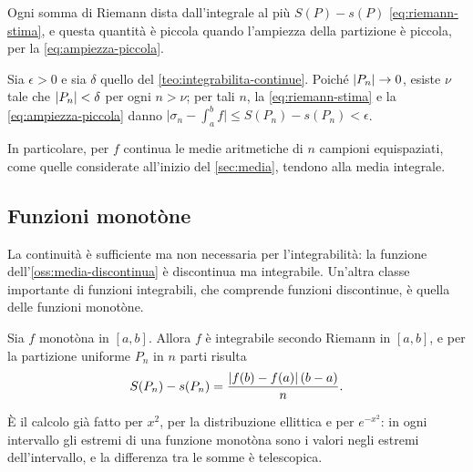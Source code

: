 \begin{strategia}
Ogni somma di Riemann dista dall'integrale al più $S(P)-s(P)$ \eqref{eq:riemann-stima}, e
questa quantità è piccola quando l'ampiezza della partizione è piccola, per la
\eqref{eq:ampiezza-piccola}.
\end{strategia}

\begin{dimostrazione}
Sia $\epsilon>0$ e sia $\delta$ quello del \cref{teo:integrabilita-continue}. Poiché
$\lvert P_{n}\rvert\to0$, esiste $\nu$ tale che $\lvert P_{n}\rvert<\delta$ per ogni $n>\nu$; per tali $n$,
la \eqref{eq:riemann-stima} e la \eqref{eq:ampiezza-piccola} danno
$\bigl|\sigma_{n}-\int_{a}^{b}f\bigr|\le S(P_{n})-s(P_{n})<\epsilon$.
\end{dimostrazione}

In particolare, per $f$ continua le medie aritmetiche di $n$ campioni equispaziati,
come quelle considerate all'inizio del \cref{sec:media}, tendono alla media integrale.

\subsection{Funzioni monotòne}

La continuità è sufficiente ma non necessaria per l'integrabilità: la funzione
dell'\cref{oss:media-discontinua} è discontinua ma integrabile. Un'altra classe
importante di funzioni integrabili, che comprende funzioni discontinue, è quella delle
funzioni monotòne.

\begin{teorema}\label{teo:integrabilita-monotone}
Sia $f$ monotòna in $[a,b]$. Allora $f$ è integrabile secondo Riemann in $[a,b]$, e per
la partizione uniforme $P_{n}$ in $n$ parti risulta
\begin{equation}\label{eq:monotone-S-s}
  S(P_{n})-s(P_{n})=\frac{\lvert f(b)-f(a)\rvert\,(b-a)}n .
\end{equation}
\end{teorema}

\begin{schema}
\end{schema}

\begin{strategia}
È il calcolo già fatto per $x^{2}$, per la distribuzione ellittica e per
$e^{-x^{2}}$: in ogni intervallo gli estremi di una funzione monotòna sono i valori negli
estremi dell'intervallo, e la differenza tra le somme è telescopica.
\end{strategia}

